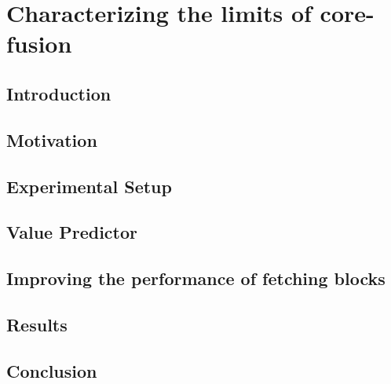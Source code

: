 \chapter{Characterizing the limits of core-fusion}

\section{Introduction}\label{sect:introduction-chapter3}

\section{Motivation}\label{sect:ch3-motivation}

\section{Experimental Setup}
\label{chp:chp3:sec:exp}
\section{Value Predictor}

\section{Improving the performance of fetching blocks}\label{chp3:sec:fetch}

\section{Results}
\label{chp:chp3:sec:analysis}
\section{Conclusion}

%
%